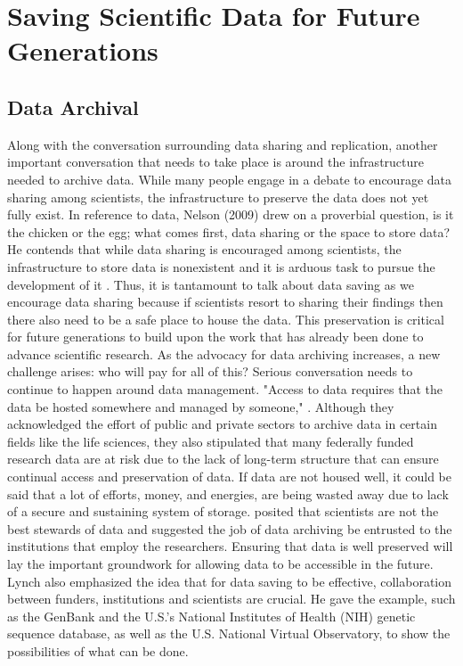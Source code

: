 \documentclass[sigconf]{acmart}
\begin{document}
\section{Saving Scientific Data for Future Generations
}

\subsection{Data Archival}

Along with the conversation surrounding data sharing and replication, another important conversation that needs to take place is around the infrastructure needed to archive data. While many people engage in a debate to encourage data sharing among scientists, the infrastructure to preserve the data does not yet fully exist. In reference to data, Nelson (2009) drew on a proverbial question, is it the chicken or the egg; what comes first, data sharing or the space to store data? He contends that while data sharing is encouraged among scientists, the infrastructure to store data is nonexistent and it is arduous task to pursue the development of it \cite{nelson2009empty}. Thus, it is tantamount to talk about data saving as we encourage data sharing because if scientists resort to sharing their findings then there also need to be a safe place to house the data. This preservation is critical for future generations to build upon the work that has already been done to advance scientific research. As the advocacy for data archiving increases, a new challenge arises: who will pay for all of this?
Serious conversation needs to continue to happen around data management. "Access to data requires that the data be hosted somewhere and managed by someone," \cite{berman2013will}. Although they acknowledged the effort of public and private sectors to archive data in certain fields like the life sciences, they also stipulated that many federally funded research data are at risk due to the lack of long-term structure that can ensure continual access and preservation of data. If data are not housed well, it could be said that a lot of efforts, money, and energies, are being wasted away due to lack of a secure and sustaining system of storage. \cite{lynch2008big} posited that scientists are not the best stewards of data and suggested the job of data archiving be entrusted to the institutions that employ the researchers. Ensuring that data is well preserved will lay the important groundwork for allowing data to be accessible in the future. Lynch also emphasized the idea that for data saving to be effective, collaboration between funders, institutions and scientists are crucial. He gave the example, such as the GenBank and the U.S.'s National Institutes of Health (NIH) genetic sequence database, as well as the U.S. National Virtual Observatory, to show the possibilities of what can be done.
\end{document}
